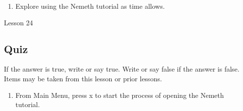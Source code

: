 \documentclass[10pt,letterpaper,twoside]{report}
\begin{document}
{{{{\begin{enumerate}
\begin{enumerate}
		      \item Space with r will stop your answer so you can try again.
		            
		      \item To review the correct answer, press space with i.
		            
		      \item The proof reading exercises are next.  You will need to edit the Braille so that it is spoken correctly.
		            
		      \item Space with c will let you hear the item again.
		            
		      \item Move back and forward by word in the usual manner.  Space with 2 5 will read the current word.
		            
		      \item Press enter to have your answer graded.
		            
		      \item Space with r will stop your current answer and allow you to start again.
		            
		      \item Use space with h to get help and learn the commands at any time.
		            
		      \item You can review without answering by stopping your answer and pressing space.
		            
		            
	      \end{enumerate}
	\item Explore using the Nemeth tutorial as time allows.
\end{enumerate}





\clearpage

\newpage
Lesson 24

\subsection{Quiz}



If the answer is true, write or say true.  Write or say false if the answer is false.  Items may be taken from this lesson or prior lessons.



\begin{enumerate}
	\item From Main Menu, press x to start the process of opening the Nemeth tutorial.
	      

\end{enumerate}}}}}
\end{document}
